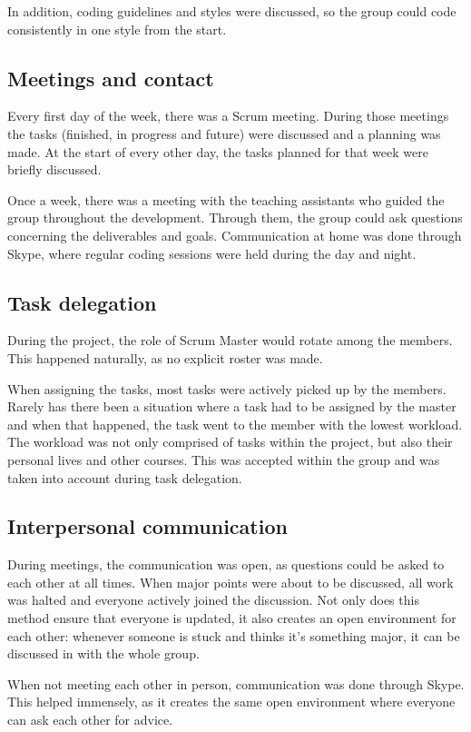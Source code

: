 \documentclass[10pt,a4paper]{report}
\begin{document}
			In addition, coding guidelines and styles were discussed, so the group could code consistently in one style from the start.
		
		\subsection{Meetings and contact}
			Every first day of the week, there was a Scrum meeting. During those meetings the tasks (finished, in progress and future) were discussed and a planning was made. At the start of every other day, the tasks planned for that week were briefly discussed.
			
			Once a week, there was a meeting with the teaching assistants who guided the group throughout the development. Through them, the group could ask questions concerning the deliverables and goals.
			Communication at home was done through Skype, where regular coding sessions were held during the day and night.

		\subsection{Task delegation}
			During the project, the role of Scrum Master would rotate among the members. This happened naturally, as no explicit roster was made.
			
			When assigning the tasks, most tasks were actively picked up by the members. Rarely has there been a situation where a task had to be assigned by the master and when that happened, the task went to the member with the lowest workload. The workload was not only comprised of tasks within the project, but also their personal lives and other courses. This was accepted within the group and was taken into account during task delegation.

		\subsection{Interpersonal communication}
			During meetings, the communication was open, as questions could be asked to each other at all times. When major points were about to be discussed, all work was halted and everyone actively joined the discussion. Not only does this method ensure that everyone is updated, it also creates an open environment for each other: whenever someone is stuck and thinks it's something major, it can be discussed in with the whole group.
			
			When not meeting each other in person, communication was done through Skype. This helped immensely, as it creates the same open environment where everyone can ask each other for advice.
\end{document}
